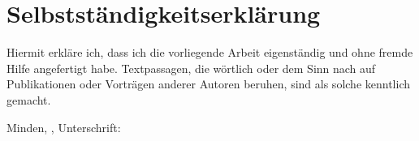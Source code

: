 \chapter*{Selbstständigkeitserklärung}
Hiermit erkläre ich, dass ich die vorliegende Arbeit eigenständig und ohne fremde Hilfe 
angefertigt habe. Textpassagen, die wörtlich oder dem Sinn nach auf Publikationen oder 
Vorträgen anderer Autoren beruhen, sind als solche kenntlich gemacht.

\vspace{1cm}

\begin{flushleft}
    Minden, \thedate, Unterschrift: \hrulefill
\end{flushleft}